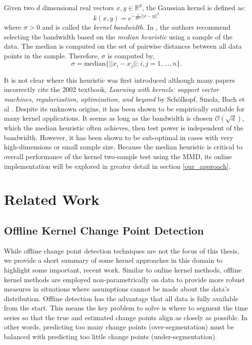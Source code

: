 Given two $d$ dimensional real vectors $x, y \in \mathbb{R}^d$, the Gaussian kernel is defined as:
\begin{equation}
k(x, y)= e^{-\frac{1}{2\sigma^2}||x-y||^2}
\end{equation}
where $\sigma > 0$ and is called the \textit{kernel bandwidth}. In \cite{gretton2005kernel}, the authors recommend selecting the bandwidth based on the \textit{median heuristic} using a sample of the data. The median is computed on the set of pairwise distances between all data points in the sample. Therefore, $\sigma$ is computed by, 
\begin{equation}
\sigma=\text{median}\{||x_i-x_j||:i,j = 1,...,n \}.
\end{equation}

It is not clear where this heuristic was first introduced although many papers incorrectly cite the 2002 textbook, \textit{Learning with kernels: support vector machines, regularization, optimization, and beyond} by Sch{\"o}lkopf, Smola, Bach et al \cite{garreau2017large}. Despite its unknown origins, it has been shown to be empirically suitable for many kernel applications. It seems as long as the bandwidth is chosen $\mathcal{O}(\sqrt{d})$, which the median heuristic often achieves, then test power is independent of the bandwidth. However, it has been shown to be sub-optimal in cases with very high-dimensions \cite{muandet2014kernel} or small sample size\cite{ramdas2015decreasing}. Because the median heuristic is critical to overall performance of the kernel two-sample test using the MMD, its online implementation will be explored in greater detail in section \ref{our_approach}.
 
\section{Related Work}
\label{related_works}

\subsection{Offline Kernel Change Point Detection}
While offline change point detection techniques are not the focus of this thesis, we provide a short summary of some kernel approaches in this domain to highlight some important, recent work.  Similar to online kernel methods, offline kernel methods are employed non-parametrically on data to provide more robust measures in situations where assumptions cannot be made about the data's distribution. Offline detection has the advantage that all data is fully available from the start. This means the key problem to solve is where to segment the time series so that the true and estimated change points align as closely as possible.  In other words, predicting too many change points (over-segmentation) must be balanced with predicting too little change points (under-segmentation). 

